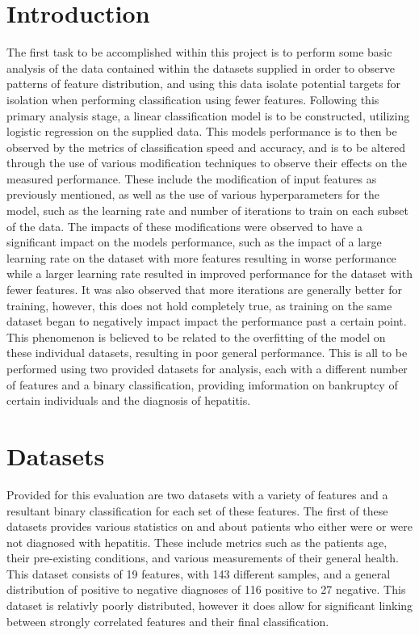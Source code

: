 \section{Introduction}

The first task to be accomplished within this project is to perform some basic analysis of the data contained within the datasets supplied in order to observe patterns of feature distribution, 
and using this data isolate potential targets for isolation when performing classification using fewer features. Following this primary analysis stage, a linear classification model is to be constructed, utilizing logistic regression on the supplied data. This models performance is to then be observed by the metrics of classification speed and accuracy, and is to be altered through the use of various modification techniques to observe their effects on the measured performance. These include the modification of input features as previously mentioned, as well as the use of various hyperparameters for the model, such as the learning rate and number of iterations to train on each subset of the data. The impacts of these modifications were observed to have a significant impact on the models performance, such as the impact of a large learning rate on the dataset with more features resulting in worse performance while a larger learning rate resulted in improved performance for the dataset with fewer features. It was also observed that more iterations are generally better for training, however, this does not hold completely true, as training on the same dataset began to negatively impact impact the performance past a certain point. This phenomenon is believed to be related to the overfitting of the model on these individual datasets, resulting in poor general performance. This is all to be performed using two provided datasets for analysis, each with a different number of features and a binary classification, providing imformation on bankruptcy of certain individuals and the diagnosis of hepatitis.

\newpage

\section{Datasets}

Provided for this evaluation are two datasets with a variety of features and a resultant binary classification for each set of these features. The first of these datasets provides various statistics on and about patients who either were or were not diagnosed with hepatitis. These include metrics such as the patients age, their pre-existing conditions, and various measurements of their general health. This dataset consists of 19 features, with 143 different samples, and a general distribution of positive to negative diagnoses of 116 positive to 27 negative. This dataset is relativly poorly distributed, however it does allow for significant linking between strongly correlated features and their final classification.\\

